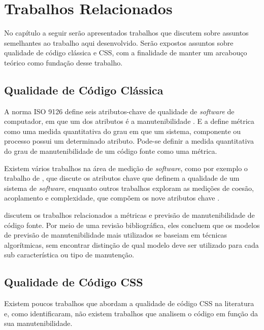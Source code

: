 %
%

\chapter{Trabalhos Relacionados}

No capítulo a seguir serão apresentados trabalhos que discutem sobre assuntos semelhantes ao trabalho aqui desenvolvido.
Serão expostos assuntos sobre qualidade de código clássica e CSS, com a finalidade de manter um arcabouço teórico como fundação desse trabalho.

\section{Qualidade de Código Clássica}

A norma ISO 9126 define seis atributos-chave de qualidade de \textit{software} de computador, em que um dos atributos é a manutenibilidade \cite{Pressman:2010}. E a  define métrica como uma medida quantitativa do grau em que um sistema, componente ou processo possui um determinado atributo. Pode-se definir a medida quantitativa do grau de manutenibilidade de um código fonte como uma métrica.

Existem vários trabalhos na área de medição de \textit{software}, como por exemplo o trabalho de , que discute os atributos chave que definem a qualidade de um sistema de \textit{software}, enquanto outros trabalhos exploram as medições de coesão, acoplamento e complexidade, que compõem os nove atributos chave \cite{McCabe:1989,Zuse:1991,Bieman1994,Dhama:1995,Zuse:1997} .

 discutem os trabalhos relacionados a métricas e previsão de manutenibilidade de código fonte. Por meio de uma revisão bibliográfica, eles concluem que os modelos de previsão de manutenibilidade mais utilizados se baseiam em técnicas algorítmicas, sem encontrar distinção de qual modelo deve ser utilizado para cada sub característica ou tipo de manutenção.

\section{Qualidade de Código CSS}

Existem poucos trabalhos que abordam a qualidade de código CSS na literatura e, como  identificaram, não existem trabalhos que analisem o código em função da sua manutenibilidade.

